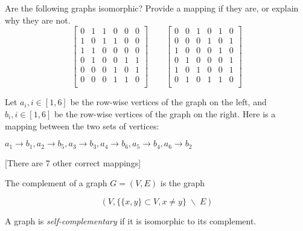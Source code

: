 \documentclass[addpoints]{exam}
\begin{document}
\begin{questions}
\begin{solution}
  \end{solution}
  
\question 
Are the following graphs isomorphic? Provide a mapping if they are, or explain why they are not.
\[
\begin{bmatrix}
0 & 1 & 1 & 0 & 0 & 0\\
1 & 0 & 1 & 1 & 0 & 0\\
1 & 1 & 0 & 0 & 0 & 0\\
0 & 1 & 0 & 0 & 1 & 1\\
0 & 0 & 0 & 1 & 0 & 1\\
0 & 0 & 0 & 1 & 1 & 0\\
\end{bmatrix}
\qquad
\begin{bmatrix}
0 & 0 & 1 & 0 & 1 & 0\\
0 & 0 & 0 & 1 & 0 & 1\\
1 & 0 & 0 & 0 & 1 & 0\\
0 & 1 & 0 & 0 & 0 & 1\\
1 & 0 & 1 & 0 & 0 & 1\\
0 & 1 & 0 & 1 & 1 & 0\\
\end{bmatrix}
\]

  \begin{solution}
  Let $a_i,i \in [1,6]$ be the row-wise vertices of the graph on the left, and $b_i,i \in [1,6]$ be the row-wise vertices of the graph on the right. Here is a mapping between the two sets of vertices:
  
   $a_1 \rightarrow b_1,a_2 \rightarrow b_5,a_3 \rightarrow b_3,a_4\rightarrow b_6,a_5 \rightarrow b_4,a_6 \rightarrow b_2$ 
   
   [There are 7 other correct mappings]
   
   
    
  \end{solution}

\question
The complement of a graph $G = (V,E)$ is the graph 

\[(V,\{\{x,y\} \subset V, x \not = y\} \;\backslash \;E)\]

A graph is \textit{self-complementary} if it is isomorphic to its complement.

\end{questions}
\end{document}
